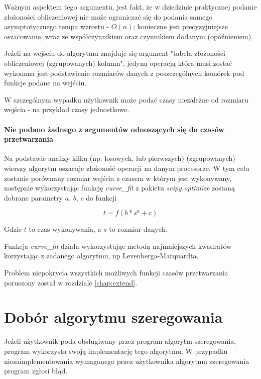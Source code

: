 \documentclass[brudnopis]{xmgr}
\begin{document}
Ważnym aspektem tego argumentu, jest fakt, że w dziedzinie praktycznej podanie złożoności obliczeniowej nie może ograniczać się do podania samego asymptotycznego tempa wzrostu - $O(n)$; konieczne jest precyzyjniejsze oszacowanie, wraz ze współczynnikiem oraz czynnikiem dodanym (opóźnieniem).

Jeżeli na wejściu do algorytmu znajduje się argument "tabela złożoności obliczeniowej (zgrupowanych) kolumn", jedyną operacją która musi zostać wykonana jest podstawienie rozmiarów danych z poszczególnych komórek pod funkcje podane na wejściu.

W szczególnym wypadku użytkownik może podać czasy niezależne od rozmiaru wejścia - na przykład czasy jednostkowe.

\paragraph{Nie podano żadnego z argumentów odnoszących się do czasów przetwarzania}

Na podstawie analizy kilku (np. losowych, lub pierwszych) (zgrupowanych) wierszy algorytm oszacuje złożoność operacji na danym procesorze.
W tym celu zostanie porównany rozmiar wejścia z czasem w którym jest wykonywany, następnie wykorzystując funkcję \emph{curve\_fit} z pakietu \emph{scipy.optimize} zostaną dobrane parametry $a$, $b$, $c$ do funkcji

$$t = f(b * s^a + c)$$

Gdzie $t$ to czas wykonywania, a $s$ to rozmiar danych.

Funkcja \emph{curve\_fit} działa wykorzystując metodą najmniejszych kwadratów korzystając z zadanego algorytmu, np Levenberga-Marquardta.

Problem niepokrycia wszystkich możliwych funkcji czasów przetwarzania poruszony został w rozdziale \ref{chap:extend}.


\section{Dobór algorytmu szeregowania}


Jeżeli użytkownik poda obsługiwany przez program algorytm szeregowania, program wykorzysta swoją implementację tego algorytmu.
W przypadku niezaimplementowania wymaganego przez użytkownika algorytmu szeregowania program zgłosi błąd.
\end{document}
